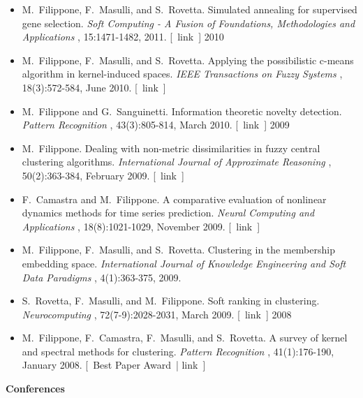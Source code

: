 \documentclass[10pt]{article}
\begin{document}
\begin{itemize}
\item 

  M. Filippone, F. Masulli, and S. Rovetta. Simulated annealing for supervised gene selection. \emph{Soft Computing - A Fusion of Foundations, Methodologies and Applications}
, 15:1471-1482, 2011. [ link ] 
2010
\item 

  M. Filippone, F. Masulli, and S. Rovetta. Applying the possibilistic c-means algorithm in kernel-induced spaces. \emph{IEEE Transactions on Fuzzy Systems}
, 18(3):572-584, June 2010. [ link ] 

\item 

  M. Filippone and G. Sanguinetti. Information theoretic novelty detection. \emph{Pattern Recognition}
, 43(3):805-814, March 2010. [ link ] 
2009
\item 

  M. Filippone. Dealing with non-metric dissimilarities in fuzzy central clustering algorithms. \emph{International Journal of Approximate Reasoning}
, 50(2):363-384, February 2009. [ link ] 

\item 

  F. Camastra and M. Filippone. A comparative evaluation of nonlinear dynamics methods for time series prediction. \emph{Neural Computing and Applications}
, 18(8):1021-1029, November 2009. [ link ] 

\item 

  M. Filippone, F. Masulli, and S. Rovetta. Clustering in the membership embedding space. \emph{International Journal of Knowledge Engineering and Soft Data Paradigms}
, 4(1):363-375, 2009. 

\item 

  S. Rovetta, F. Masulli, and M. Filippone. Soft ranking in clustering. \emph{Neurocomputing}
, 72(7-9):2028-2031, March 2009. [ link ] 
2008
\item 

  M. Filippone, F. Camastra, F. Masulli, and S. Rovetta. A survey of kernel and spectral methods for clustering. \emph{Pattern Recognition}
, 41(1):176-190, January 2008. [ Best Paper Award | link ] 


\end{itemize}
\textbf{Conferences}
\end{document}
